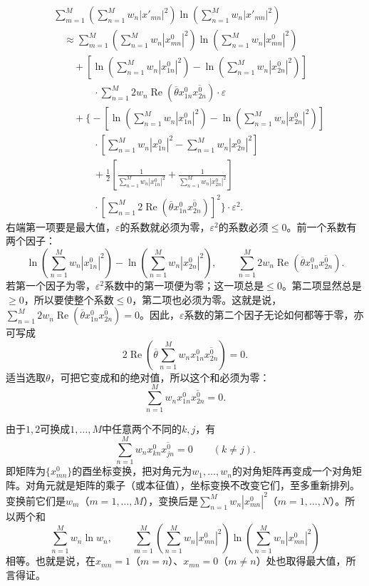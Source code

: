 \documentclass[fontsize=13pt,twoside,openany,headings=normal,parskip=false,bookmarkpackage=false,DIV=calc]{scrbook}
\begin{document}
\begin{align*}
&\sum_{m=1}^M\left(\sum_{n=1}^Mw_n|x'_{mn}|^2\right)\ln\left(\sum_{n=1}^Mw_n|x'_{mn}|^2\right)\\
&\quad\approx\sum_{m=1}^M\left(\sum_{n=1}^Mw_n|x^0_{mn}|^2\right)\ln\left(\sum_{n=1}^Mw_n|x^0_{mn}|^2\right)\\
&\qquad+\left[\ln\left(\sum_{n=1}^Mw_n|x^0_{1n}|^2\right)-\ln\left(\sum_{n=1}^Mw_n|x^0_{2n}|^2\right)\right]\\
&\qquad\qquad\cdot\sum_{n=1}^M2w_n\operatorname{Re}(\overline\theta x^0_{1n}\overline{x^0_{2n}})\cdot\varepsilon\\
&\qquad+\Biggl\{-\left[\ln\left(\sum_{n=1}^Mw_n|x^0_{1n}|^2\right)-\ln\left(\sum_{n=1}^Mw_n|x^0_{2n}|^2\right)\right]\\
&\qquad\qquad\cdot\left[\sum_{n=1}^Mw_n|x^0_{1n}|^2-\sum_{n=1}^Mw_n|x^0_{2n}|^2\right]\\
&\qquad\qquad+\frac12\left[\frac1{\sum_{n=1}^Mw_n|x^0_{1n}|^2}+\frac1{\sum_{n=1}^Mw_n|x^0_{2n}|^2}\right]\\
&\qquad\qquad\cdot\left[\sum_{n=1}^M2\operatorname{Re}(\overline\theta x^0_{1n}\overline{x^0_{2n}})\right]^2\Biggr\}\cdot\varepsilon^2.
\end{align*}
右端第一项要是最大值，$\varepsilon$的系数就必须为零，$\varepsilon^2$的系数必须$\leq0$。前一个系数有两个因子：
\[
\ln\left(\sum_{n=1}^Mw_n|x^0_{1n}|^2\right)-\ln\left(\sum_{n=1}^Mw_n|x^0_{2n}|^2\right),
\qquad\sum_{n=1}^M2w_n\operatorname{Re}(\overline\theta x^0_{1n}\overline{x^0_{2n}}).
\]
若第一个因子为零，$\varepsilon^2$系数中的第一项便为零；这一项总是$\leq0$。第二项显然总是$\geq0$，所以要使整个系数$\leq0$，第二项也必须为零。这就是说，$\sum_{n=1}^M2w_n\operatorname{Re}(\overline\theta x^0_{1n}\overline{x^0_{2n}})=0$。因此，$\varepsilon$系数的第二个因子无论如何都等于零，亦可写成
\[
2\operatorname{Re}\left(\overline\theta\sum_{n=1}^Mw_nx^0_{1n}\overline{x^0_{2n}}\right)=0.
\]
适当选取$\theta$，可把它变成和的绝对值，所以这个和必须为零：
\[
\sum_{n=1}^Mw_nx^0_{1n}\overline{x^0_{2n}}=0.
\]

\hypertarget{origpage-205}{}\label{origpage-205}由于$1,\allowbreak 2$可换成$1,\allowbreak \ldots,\allowbreak M$中任意两个不同的$k,\allowbreak j$，有
\[
\sum_{n=1}^Mw_nx^0_{kn}\overline{x^0_{jn}}=0\qquad(k\ne j).
\]
即矩阵为$\{x^0_{mn}\}$的酉坐标变换，把对角元为$w_1,\allowbreak \ldots,\allowbreak w_n$的对角矩阵再变成一个对角矩阵。对角元就是矩阵的乘子（或本征值），坐标变换不改变它们，至多重新排列。变换前它们是$w_m$（$m=1,\allowbreak \ldots,\allowbreak M$），变换后是$\sum_{n=1}^Mw_n|x^0_{mn}|^2$（$m=1,\allowbreak \ldots,\allowbreak N$）。所以两个和
\[
\sum_{n=1}^Mw_n\ln w_n,\qquad
\sum_{m=1}^M\left(\sum_{n=1}^Mw_n|x^0_{mn}|^2\right)\ln\left(\sum_{n=1}^Mw_n|x^0_{mn}|^2\right)
\]
相等。也就是说，在$x_{mn}=1$（$m=n$）、$x_{mn}=0$（$m\ne n$）处也取得最大值，所言得证。
\end{document}
